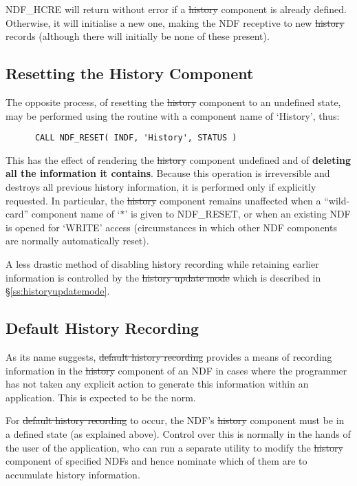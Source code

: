 NDF\_HCRE will return without error if a \st{history\/} component is
already defined. Otherwise, it will initialise a new one, making the
NDF receptive to new \st{history\/} records (although there will
initially be none of these present).

\subsection{\label{ss:resettinghistory}Resetting the History Component}

The opposite process, of resetting the \st{history\/} component to an
undefined state, may be performed using the  routine with a
component name of `History', thus:

\small
\begin{verbatim}
      CALL NDF_RESET( INDF, 'History', STATUS )
\end{verbatim}
\normalsize

This has the effect of rendering the \st{history\/} component undefined
and of {\bf deleting all the information it contains}. Because this
operation is irreversible and destroys all previous history
information, it is performed only if explicitly requested. In
particular, the \st{history\/} component remains unaffected when a
``wild-card'' component name of `$*$' is given to NDF\_RESET, or when
an existing NDF is opened for `WRITE' access (circumstances in which
other NDF components are normally automatically reset).

A less drastic method of disabling history recording while retaining
earlier information is controlled by the \st{history update mode\/}
which is described in \S\ref{ss:historyupdatemode}.

\subsection{\label{ss:defaulthistory}Default History Recording}
As its name suggests, \st{default history recording\/} provides a means
of recording information in the \st{history\/} component of an NDF in
cases where the programmer has not taken any explicit action to
generate this information within an application. This is expected to
be the norm.

For \st{default history recording\/} to occur, the NDF's \st{history\/}
component must be in a defined state (as explained above). Control
over this is normally in the hands of the user of the application, who
can run a separate utility to modify the \st{history\/} component of
specified NDFs and hence nominate which of them are to accumulate
history information.

